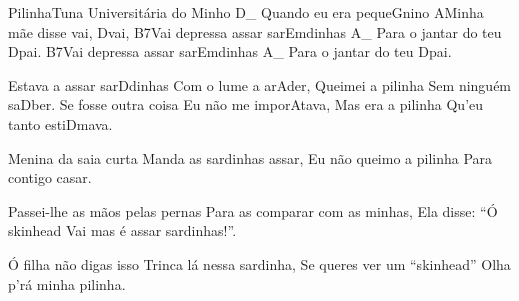\begin{musica}{Pilinha}{Tuna Universitária do Minho}{}
\ac{D}{}_ Quando eu era peque\ac{G}{ni}no
\ac{A}{Mi}nha mãe disse vai, \ac{D}{vai},
\ac{B7}{Vai} depressa assar sar\ac{Em}{di}nhas \ac{A}{}_
Para o jantar do teu \ac{D}{pai}.
\ac{B7}{Vai} depressa assar sar\ac{Em}{di}nhas \ac{A}{}_
Para o jantar do teu \ac{D}{pai}.

Estava a assar sar\ac{D}{di}nhas
Com o lume a ar\ac{A}{der},
Queimei a pilinha
Sem ninguém sa\ac{D}{ber}.
Se fosse outra coisa
Eu não me impor\ac{A}{ta}va,
Mas era a pilinha
Qu’eu tanto esti\ac{D}{ma}va.

Menina da saia curta
Manda as sardinhas assar,
Eu não queimo a pilinha
Para contigo casar.


Passei-lhe as mãos pelas pernas
Para as comparar com as minhas,
Ela disse: “Ó skinhead
Vai mas é assar sardinhas!”.


Ó filha não digas isso
Trinca lá nessa sardinha,
Se queres ver um “skinhead”
Olha p’rá minha pilinha.

\end{musica}
